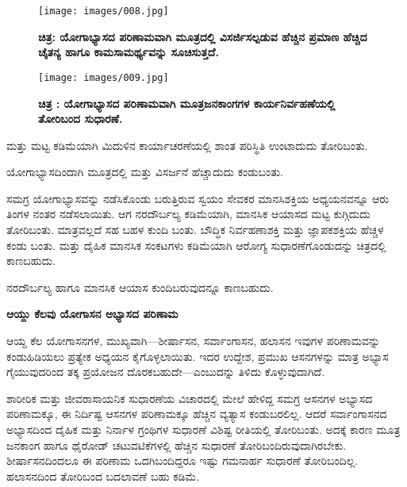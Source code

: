 \begin{figure}
\texttt{[image: images/008.jpg]}
\caption{ \textbf{ಚಿತ್ರ:  ಯೋಗಾಭ್ಯಾಸದ ಪರಿಣಾಮವಾಗಿ ಮೂತ್ರದಲ್ಲಿ ವಿಸರ್ಜಿಸಲ್ಪಡುವ ಹೆಚ್ಚಿನ  ಪ್ರಮಾಣ ಹೆಚ್ಚಿದ ಚೈತನ್ಯ ಹಾಗೂ ಕಾಮಸಾಮರ್ಥ್ಯವನ್ನು ಸೂಚಿಸುತ್ತದೆ.} }
\end{figure}

\begin{center}
\end{center}


\begin{figure}
\texttt{[image: images/009.jpg]}
\caption{ \textbf{ಚಿತ್ರ : ಯೋಗಾಭ್ಯಾಸದ ಪರಿಣಾಮವಾಗಿ ಮೂತ್ರಜನಕಾಂಗಗಳ ಕಾರ್ಯನಿರ್ವಹಣೆಯಲ್ಲಿ ತೋರಿಬಂದ ಸುಧಾರಣೆ.} }
\end{figure}

 ಮತ್ತು  ಮಟ್ಟ ಕಡಿಮೆಯಾಗಿ ಮಿದುಳಿನ ಕಾರ್ಯಾಚರಣೆಯಲ್ಲಿ ಶಾಂತ ಪರಿಸ್ಥಿತಿ ಉಂಟಾದುದು ತೋರಿಬಂತು.

ಯೋಗಾಭ್ಯಾಸದಿಂದಾಗಿ ಮೂತ್ರದಲ್ಲಿ  ಮತ್ತು  ವಿಸರ್ಜನೆ ಹೆಚ್ಚಾದುದು ಕಂಡುಬಂತು.

ಸಮಗ್ರ ಯೋಗಾಭ್ಯಾಸವನ್ನು ನಡೆಸಿಕೊಂಡು ಬರುತ್ತಿರುವ ಸ್ವಯಂ ಸೇವಕರ ಮಾನಸಿಶಕ್ತಿಯ ಅಧ್ಯಯನವನ್ನೂ ಆರು ತಿಂಗಳ ನಂತರ ನಡೆಸಲಾಯಿತು. ಆಗ ನರದೌರ್ಬಲ್ಯ  ಕಡಿಮೆಯಾಗಿ, ಮಾನಸಿಕ ಆಯಾಸದ ಮಟ್ಟ ಕುಗ್ಗಿದುದು ತೋರಿಬಂತು. ಮಾತ್ರವಲ್ಲದೆ  ಸಹ ಬಹಳ ಕುಂದಿ ಬಂತು. ಬೌದ್ಧಿಕ ನಿರ್ವಹಣಾಶಕ್ತಿ ಮತ್ತು ಜ್ಞಾಪಕಶಕ್ತಿಯ ಹೆಚ್ಚಳ ಕಂಡು ಬಂತು.  ಮತ್ತು  ದೈಹಿಕ ಮಾನಸಿಕ ಸಂಕಟಗಳು ಕಡಿಮೆಯಾಗಿ ಆರೋಗ್ಯ ಸುಧಾರಣೆಗೊಂಡುದನ್ನು ಚಿತ್ರದಲ್ಲಿ ಕಾಣಬಹುದು.

ನರದೌರ್ಬಲ್ಯ ಹಾಗೂ ಮಾನಸಿಕ ಆಯಾಸ ಕುಂದಿಬರುವುದನ್ನೂ ಕಾಣಬಹುದು.

\textbf{ಆಯ್ದು ಕೆಲವು ಯೋಗಾಸನ ಅಭ್ಯಾಸದ ಪರಿಣಾಮ}

ಆಯ್ದ ಕೆಲ ಯೋಗಾಸನಗಳ, ಮುಖ್ಯವಾಗಿ—ಶೀರ್ಷಾಸನ, ಸರ್ವಾಂಗಾಸನ, ಹಲಾಸನ ಇವುಗಳ ಪರಿಣಾಮವನ್ನು ಕಂಡುಹಿಡಿಯಲು ಪ್ರತ್ಯೇಕ ಅಧ್ಯಯನ ಕೈಗೊಳ್ಳಲಾಯಿತು. ಇದರ ಉದ್ದೇಶ, ಪ್ರಮುಖ ಆಸನಗಳನ್ನು ಮಾತ್ರ ಅಭ್ಯಾಸ ಗೈಯುವುದರಿಂದ ತಕ್ಕ ಪ್ರಯೋಜನ ದೊರಕಬಹುದೇ—ಎಂಬುದನ್ನು ತಿಳಿದು ಕೊಳ್ಳುವುದಾಗಿದೆ.

ಶಾರೀರಿಕ ಮತ್ತು ಜೀವರಾಸಾಯನಿಕ ಸುಧಾರಣೆಯ ವಿಚಾರದಲ್ಲಿ ಮೇಲೆ ಹೇಳಿದ್ದ ಸಮಗ್ರ ಆಸನಗಳ ಅಭ್ಯಾಸದ ಪರಿಣಾಮಕ್ಕೂ, ಈ ನಿರ್ದಿಷ್ಟ ಆಸನಗಳ ಪರಿಣಾಮಕ್ಕೂ ಹೆಚ್ಚಿನ ವ್ಯತ್ಯಾಸ ಕಂಡುಬರಲಿಲ್ಲ. ಆದರೆ ಸರ್ವಾಂಗಾಸನದ ಅಭ್ಯಾಸದಿಂದ ದೈಹಿಕ ಮತ್ತು ನಿರ್ನಾಳ ಗ್ರಂಥಿಗಳ  ಸುಧಾರಣೆ ವಿಶಿಷ್ಟ ರೀತಿಯಲ್ಲಿ ತೋರಿಬಂತು. ಅದಕ್ಕೆ ಕಾರಣ ಮೂತ್ರ ಜನಕಾಂಗ ಹಾಗೂ ಥೈರೋಡ್ ಚಟುವಟಿಕೆಗಳಲ್ಲಿ ಹೆಚ್ಚಿನ ಸುಧಾರಣೆ ತೋರಿಬಂದಿರುವುದಾಗಿರಬೇಕು. ಶೀರ್ಷಾಸನದಿಂದಲೂ ಈ ಪರಿಣಾಮ ಒದಗಿಬಂದಿದ್ದರೂ ಇಷ್ಟು ಗಮನಾರ್ಹ ಸುಧಾರಣೆ ತೋರಿಬಂದಿಲ್ಲ. ಹಲಾಸನದಿಂದ ತೋರಿಬಂದ ಬದಲಾವಣೆ ಬಹು ಕಡಿಮೆ.

